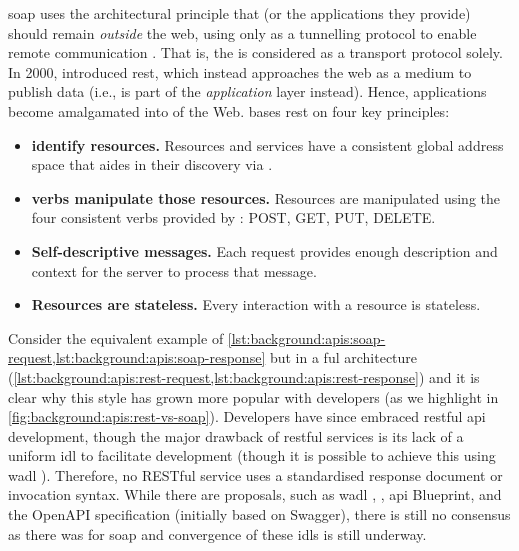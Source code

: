 \gls{soap} uses the architectural principle that  (or the applications they provide) should remain \textit{outside} the web, using  only as a tunnelling protocol to enable remote communication \citep{Pautasso2008}. That is, the  is considered as a transport protocol solely. In 2000, \citet{Fielding:2000vh} introduced \gls{rest}, which instead approaches the web as a medium to publish data (i.e.,  is part of the \textit{application} layer instead). Hence, applications become amalgamated into of the Web. \citeauthor{Fielding:2000vh} bases \gls{rest} on four key principles:

\begin{itemize}
  \item \textbf{ identify resources.} Resources and services have a consistent global address space that aides in their discovery via  \citep{BernersLee:2004vf}.
  \item \textbf{ verbs manipulate those resources.} Resources are manipulated using the four consistent  verbs provided by : POST, GET, PUT, DELETE.
  \item \textbf{Self-descriptive messages.} Each request provides enough description and context for the server to process that message.
  \item \textbf{Resources are stateless.} Every interaction with a resource is stateless.
\end{itemize}

\noindent
Consider the equivalent example of \cref{lst:background:apis:soap-request,lst:background:apis:soap-response} but in a ful architecture (\cref{lst:background:apis:rest-request,lst:background:apis:rest-response}) and it is clear why this style has grown more popular with developers (as we highlight in \cref{fig:background:apis:rest-vs-soap}). Developers have since embraced \gls{rest}ful \gls{api} development, though the major drawback of \gls{rest}ful services is its lack of a uniform \gls{idl} to facilitate development (though it is possible to achieve this using \gls{wadl} \citep{Mandel:2008ww}).  Therefore, no RESTful service uses a standardised response document or invocation syntax. While there are proposals, such as \gls{wadl} \citep{Hadley:2006vv}, , \gls{api} Blueprint, and the OpenAPI specification (initially based on Swagger), there is still no consensus as there was for \gls{soap} and convergence of these \glspl{idl} is still underway.

